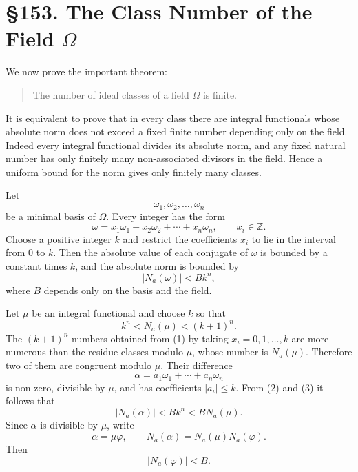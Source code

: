 \documentclass[11pt,a4paper]{book}
\newcommand{\webersection}[2]{\clearpage\section*{\S #1. #2}}
\begin{document}
\webersection{153}{The Class Number of the Field \(\Omega\)}

We now prove the important theorem:

\begin{quote}
The number of ideal classes of a field \(\Omega\) is finite.
\end{quote}
It is equivalent to prove that in every class there are integral functionals whose absolute norm does not exceed a fixed finite number depending only on the field.  Indeed every integral functional divides its absolute norm, and any fixed natural number has only finitely many non-associated divisors in the field.  Hence a uniform bound for the norm gives only finitely many classes.

Let
\[
 \omega_1,
\omega_2,
\ldots,
\omega_n
\]
be a minimal basis of \(\Omega\).  Every integer has the form
\begin{equation}
 \omega=x_1\omega_1+x_2\omega_2+
\cdots+x_n\omega_n,
\qquad x_i\in\mathbb Z. \tag{1}
\end{equation}
Choose a positive integer \(k\) and restrict the coefficients \(x_i\) to lie in the interval from \(0\) to \(k\).  Then the absolute value of each conjugate of \(\omega\) is bounded by a constant times \(k\), and the absolute norm is bounded by
\begin{equation}
 |N_a(\omega)|<Bk^n, \tag{2}
\end{equation}
where \(B\) depends only on the basis and the field.

Let \(\mu\) be an integral functional and choose \(k\) so that
\begin{equation}
 k^n<N_a(\mu)<(k+1)^n. \tag{3}
\end{equation}
The \((k+1)^n\) numbers obtained from (1) by taking \(x_i=0,1,
\ldots,k\) are more numerous than the residue classes modulo \(\mu\), whose number is \(N_a(\mu)\).  Therefore two of them are congruent modulo \(\mu\).  Their difference
\begin{equation}
 \alpha=a_1\omega_1+
\cdots+a_n\omega_n \tag{4}
\end{equation}
is non-zero, divisible by \(\mu\), and has coefficients \(|a_i|\le k\).  From (2) and (3) it follows that
\begin{equation}
 |N_a(\alpha)|<B k^n < B N_a(\mu). \tag{5}
\end{equation}
Since \(\alpha\) is divisible by \(\mu\), write
\begin{equation}
 \alpha=\mu\varphi,
\qquad N_a(\alpha)=N_a(\mu)N_a(\varphi). \tag{6}
\end{equation}
Then
\begin{equation}
 |N_a(\varphi)|<B. \tag{7}
\end{equation}
\end{document}

